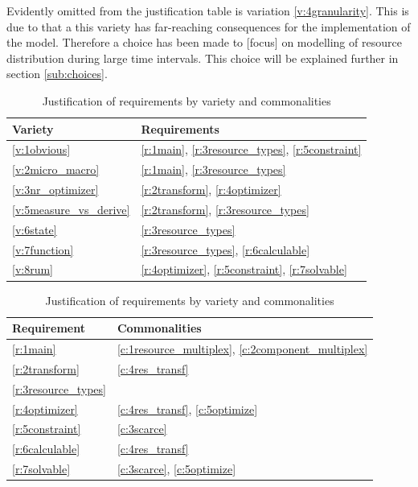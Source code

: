 Evidently omitted from the justification table is variation \ref{v:4granularity}. This is due to that a this variety has far-reaching consequences for the implementation of the model. Therefore a choice has been made to [focus] on modelling of resource distribution during large time intervals. This choice will be explained further in section \ref{sub:choices}.
\begin{table}
\centering
\begin{tabular}{|l|l|} \hline
Variety & Requirements \\ \hline
\ref{v:1obvious} & \ref{r:1main}, \ref{r:3resource_types}, \ref{r:5constraint}		\\ \hline
\ref{v:2micro_macro} & \ref{r:1main}, \ref{r:3resource_types} 	\\ \hline
\ref{v:3nr_optimizer} & \ref{r:2transform}, \ref{r:4optimizer} 	\\ \hline
\ref{v:5measure_vs_derive} & \ref{r:2transform}, \ref{r:3resource_types} \\ 	\hline
\ref{v:6state} & \ref{r:3resource_types} 	\\ \hline
\ref{v:7function} & \ref{r:3resource_types}, \ref{r:6calculable} 	\\ \hline
\ref{v:8rum} & \ref{r:4optimizer}, \ref{r:5constraint}, \ref{r:7solvable} 	\\ \hline
\end{tabular}
\hspace{24px}
\begin{tabular}{|l|l|} \hline
Requirement & Commonalities \\ \hline
\ref{r:1main} & \ref{c:1resource_multiplex}, \ref{c:2component_multiplex}	\\ \hline
\ref{r:2transform} & \ref{c:4res_transf}	\\ \hline
\ref{r:3resource_types} &	\\ \hline
\ref{r:4optimizer} & \ref{c:4res_transf}, \ref{c:5optimize} 	\\ \hline
\ref{r:5constraint} & \ref{c:3scarce}	\\ \hline
\ref{r:6calculable} & \ref{c:4res_transf}	\\ \hline
\ref{r:7solvable} & \ref{c:3scarce}, \ref{c:5optimize}	\\ \hline
\end{tabular}
\caption{Justification of requirements by variety and commonalities}
\label{table:justification}
\end{table}

